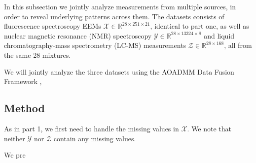 In this subsection we jointly analyze measurements from multiple sources, in order to reveal underlying patterns across them.
The datasets consists of fluorescence spectroscopy EEMs $\mathcal{X} \in \mathbb{R}^{28 \times 251 \times 21}$, identical to part one, as well as nuclear magnetic resonance (NMR) spectroscopy $\mathcal{Y}\in \mathbb{R}^{28 \times 13324 \times 8}$ and liquid chromatography-mass spectrometry (LC-MS) measurements $\mathcal{Z} \in \mathbb{R}^{28 \times 168}$, all from the same 28 mixtures.

We will jointly analyze the three datasets using the AOADMM Data Fusion Framework \cite{framework},



\subsection*{Method}

As in part 1, we first need to handle the missing values in $\mathcal{X}$.
We note that neither $\mathcal{Y}$ nor $\mathcal{Z}$ contain any missing values.

We pre
\cite{framework}



